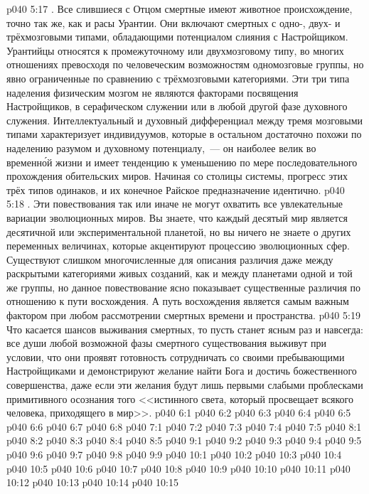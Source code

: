 \vs p040 5:17 \pc {}. Все слившиеся с Отцом смертные имеют животное происхождение, точно так же, как и расы Урантии. Они включают смертных с одно\hyp{}, двух\hyp{} и трёхмозговыми типами, обладающими потенциалом слияния с Настройщиком. Урантийцы относятся к промежуточному или двухмозговому типу, во многих отношениях превосходя по человеческим возможностям одномозговые группы, но явно ограниченные по сравнению с трёхмозговыми категориями. Эти три типа наделения физическим мозгом не являются факторами посвящения Настройщиков, в серафическом служении или в любой другой фазе духовного служения. Интеллектуальный и духовный дифференциал между тремя мозговыми типами характеризует индивидуумов, которые в остальном достаточно похожи по наделению разумом и духовному потенциалу,~--- он наиболее велик во временн\'ой жизни и имеет тенденцию к уменьшению по мере последовательного прохождения обительских миров. Начиная со столицы системы, прогресс этих трёх типов одинаков, и их конечное Райское предназначение идентично.
\vs p040 5:18 \pc {}. Эти повествования так или иначе не могут охватить все увлекательные вариации эволюционных миров. Вы знаете, что каждый десятый мир является десятичной или экспериментальной планетой, но вы ничего не знаете о других переменных величинах, которые акцентируют процессию эволюционных сфер. Существуют слишком многочисленные для описания различия даже между раскрытыми категориями живых созданий, как и между планетами одной и той же группы, но данное повествование ясно показывает существенные различия по отношению к пути восхождения. А путь восхождения является самым важным фактором при любом рассмотрении смертных времени и пространства.
\vs p040 5:19 \pc Что касается шансов выживания смертных, то пусть станет ясным раз и навсегда: все души любой возможной фазы смертного существования выживут при условии, что они проявят готовность сотрудничать со своими пребывающими Настройщиками и демонстрируют желание найти Бога и достичь божественного совершенства, даже если эти желания будут лишь первыми слабыми проблесками примитивного осознания того <<истинного света, который просвещает всякого человека, приходящего в мир>>.
\vs p040 6:1 
\vs p040 6:2 
\vs p040 6:3 
\vs p040 6:4 
\vs p040 6:5 
\vs p040 6:6 
\vs p040 6:7 
\vs p040 6:8 
\vs p040 7:1 
\vs p040 7:2 
\vs p040 7:3 
\vs p040 7:4 
\vs p040 7:5 
\vs p040 8:1 
\vs p040 8:2 
\vs p040 8:3 
\vs p040 8:4 \pc 
\vs p040 8:5 
\vs p040 9:1 
\vs p040 9:2 \pc 
\vs p040 9:3 
\vs p040 9:4 \pc 
\vs p040 9:5 
\vs p040 9:6 
\vs p040 9:7 
\vs p040 9:8 \pc 
\vs p040 9:9 \pc 
{}
\vs p040 10:1 
\vs p040 10:2 
\vs p040 10:3 \pc 
\vs p040 10:4 
\vs p040 10:5 \pc 
\vs p040 10:6 \pc 
\vs p040 10:7 
\vs p040 10:8 \pc 
\vs p040 10:9 \pc 
\vs p040 10:10 
\vs p040 10:11 
\vs p040 10:12 
\vs p040 10:13 \pc 
\vs p040 10:14 
\vsetoff
\vs p040 10:15 
\quizlink
